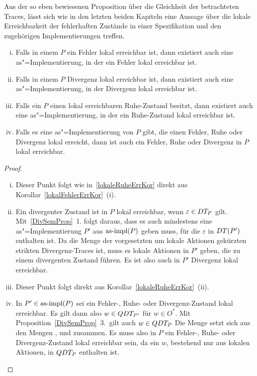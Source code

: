 Aus der so eben bewiesenen Proposition über die Gleichheit der betrachteten
Traces, lässt sich wie in den letzten beiden Kapiteln eine Aussage über die
lokale Erreichbarkeit der \glqq fehlerhaften Zustände\grqq{} in einer
Spezifikation und den zugehörigen Implementierungen treffen.

\begin{Kor}\mbox{}
  \begin{enumerate}[(i)]
    \item Falls in einem \MEIO{} $P$ ein Fehler lokal erreichbar ist, dann
      existiert auch eine as"=Implementierung, in der ein Fehler lokal
      erreichbar ist.
    \item Falls in einem \MEIO{} $P$ Divergenz lokal erreichbar ist, dann
      existiert auch eine as"=Implementierung, in der Divergenz lokal
      erreichbar ist.
    \item Falls ein \MEIO{} $P$ einen lokal erreichbaren Ruhe-Zustand besitzt,
      dann existiert auch eine as"=Implementierung, in der ein Ruhe-Zustand
      lokal erreichbar ist.
    \item Falls es eine as"=Implementierung von $P$ gibt, die einen Fehler,
      Ruhe oder Divergenz lokal erreicht, dann ist auch ein Fehler, Ruhe oder
      Divergenz in $P$ lokal erreichbar.
  \end{enumerate}
\end{Kor}
\begin{proof}\mbox{}
  \begin{enumerate}[(i)]
    \item Dieser Punkt folgt wie in~\ref{lokaleRuheErrKor} direkt aus
      Korollar~\ref{lokalFehlerErrKor}~(i).
    \item Ein divergenter Zustand ist in $P$ lokal erreichbar, wenn
      $\varepsilon \in DT _P$ gilt. Mit~\ref{DivSemProp}~1. folgt daraus, dass
      es auch mindestens eine as"=Implementierung $P'$ aus $\mathrm{as}\text{-}\mathrm{impl} (P)$ geben
      muss, für die $\varepsilon$ in $DT (P')$ enthalten ist. Da \DT{} die
      Menge der vorgesetzten um lokale Aktionen gekürzten strikten
      Divergenz-Traces ist, muss es lokale Aktionen in $P'$ geben, die zu einem
      divergenten Zustand führen. Es ist also auch in $P'$ Divergenz lokal
      erreichbar.
    \item Dieser Punkt folgt direkt aus Korollar~\ref{lokaleRuheErrKor}~(ii).
    \item In $P'\in\mathrm{as}\text{-}\mathrm{impl} (P)$ sei ein Fehler-, Ruhe- oder Divergenz-Zustand
      lokal erreichbar. Es gilt dann also $w\in QDT _{P'}$ für $w\in O^*$. Mit
      Proposition~\ref{DivSemProp}~3.\ gilt auch $w\in QDT _P$ Die Menge \QDT{}
      setzt sich aus den Mengen \ET{}, \StQT{} und \DT{} zusammen. Es muss also
      in $P$ ein Fehler-, Ruhe- oder Divergenz-Zustand lokal erreichbar sein,
      da ein $w$, bestehend nur aus lokalen Aktionen, in $QDT _P$ enthalten
      ist.
  \end{enumerate}
\end{proof}

